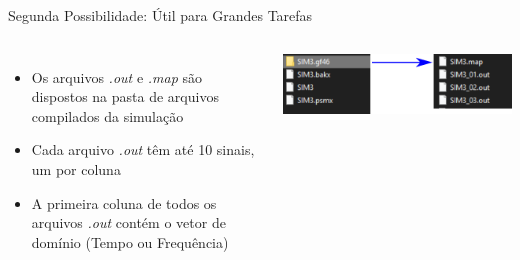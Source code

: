 \begin{frame}{Segunda Possibilidade: Útil para Grandes Tarefas}
\centering


\begin{columns}

\begin{itemize}
\item Os arquivos {\color{blue}\it .out} e {\color{blue}\it .map} são dispostos na pasta de arquivos compilados da simulação
\vspace*{1cm}
\item Cada arquivo {\color{blue}\it .out} têm até 10 sinais, um por coluna
\vspace*{1cm}
\item A primeira coluna de todos os arquivos {\color{blue}\it .out} contém o vetor de domínio (Tempo ou Frequência)  
\end{itemize}

\centering
\includegraphics[width=0.70\linewidth]{./figuras/Exportacao/Export2-files}


\end{columns}


\end{frame}






